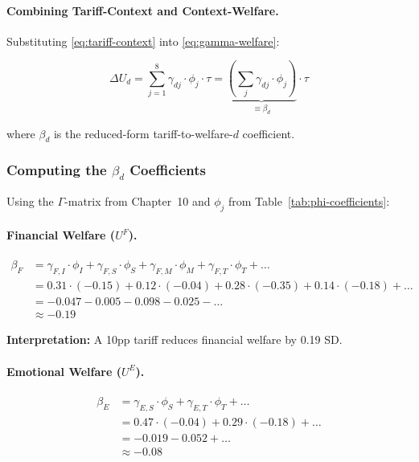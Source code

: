 \paragraph{Combining Tariff-Context and Context-Welfare.}
Substituting \eqref{eq:tariff-context} into \eqref{eq:gamma-welfare}:

\begin{equation}
\Delta U_d = \sum_{j=1}^{8} \gamma_{dj} \cdot \phi_j \cdot \tau = \underbrace{\left(\sum_{j} \gamma_{dj} \cdot \phi_j\right)}_{\equiv \beta_d} \cdot \tau
\label{eq:reduced-form}
\end{equation}

where $\beta_d$ is the reduced-form tariff-to-welfare-$d$ coefficient.

\subsubsection{Computing the $\beta_d$ Coefficients}

Using the $\Gamma$-matrix from Chapter~10 and $\phi_j$ from Table~\ref{tab:phi-coefficients}:

\paragraph{Financial Welfare ($U^F$).}
\begin{align}
\beta_F &= \gamma_{F,I} \cdot \phi_I + \gamma_{F,S} \cdot \phi_S + \gamma_{F,M} \cdot \phi_M + \gamma_{F,T} \cdot \phi_T + \ldots \nonumber \\
&= 0.31 \cdot (-0.15) + 0.12 \cdot (-0.04) + 0.28 \cdot (-0.35) + 0.14 \cdot (-0.18) + \ldots \nonumber \\
&= -0.047 - 0.005 - 0.098 - 0.025 - \ldots \nonumber \\
&\approx \mathbf{-0.19}
\end{align}

\textbf{Interpretation:} A 10pp tariff reduces financial welfare by 0.19 SD.

\paragraph{Emotional Welfare ($U^E$).}
\begin{align}
\beta_E &= \gamma_{E,S} \cdot \phi_S + \gamma_{E,T} \cdot \phi_T + \ldots \nonumber \\
&= 0.47 \cdot (-0.04) + 0.29 \cdot (-0.18) + \ldots \nonumber \\
&= -0.019 - 0.052 + \ldots \nonumber \\
&\approx \mathbf{-0.08}
\end{align}

